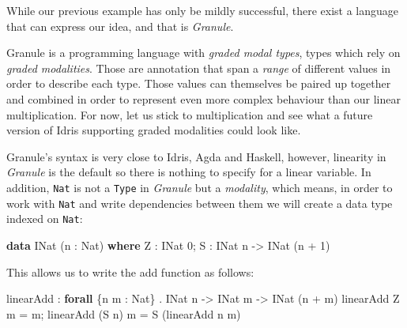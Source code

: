 \documentclass[
]{article}
\newenvironment{Shaded}{}{}
\newcommand{\DataTypeTok}[1]{\textcolor[rgb]{0.56,0.13,0.00}{#1}}
\newcommand{\DecValTok}[1]{\textcolor[rgb]{0.25,0.63,0.44}{#1}}
\newcommand{\KeywordTok}[1]{\textcolor[rgb]{0.00,0.44,0.13}{\textbf{#1}}}
\newcommand{\NormalTok}[1]{#1}
\newcommand{\OperatorTok}[1]{\textcolor[rgb]{0.40,0.40,0.40}{#1}}
\newcommand{\OtherTok}[1]{\textcolor[rgb]{0.00,0.44,0.13}{#1}}
\begin{document}
While our previous example has only be mildly successful, there exist a
language that can express our idea, and that is \emph{Granule}.

Granule is a programming language with \emph{graded modal types}, types
which rely on \emph{graded modalities}. Those are annotation that span a
\emph{range} of different values in order to describe each type. Those
values can themselves be paired up together and combined in order to
represent even more complex behaviour than our linear multiplication.
For now, let us stick to multiplication and see what a future version of
Idris supporting graded modalities could look like.

Granule's syntax is very close to Idris, Agda and Haskell, however,
linearity in \emph{Granule} is the default so there is nothing to
specify for a linear variable. In addition, \texttt{Nat} is not a
\texttt{Type} in \emph{Granule} but a \emph{modality}, which means, in
order to work with \texttt{Nat} and write dependencies between them we
will create a data type indexed on \texttt{Nat}:

\begin{Shaded}
\begin{Highlighting}[]
\KeywordTok{data} \DataTypeTok{INat}\NormalTok{ (n }\OperatorTok{:} \DataTypeTok{Nat}\NormalTok{) }\KeywordTok{where}
  \DataTypeTok{Z} \OperatorTok{:} \DataTypeTok{INat} \DecValTok{0}\NormalTok{;}
  \DataTypeTok{S} \OperatorTok{:} \DataTypeTok{INat}\NormalTok{ n }\OtherTok{{-}\textgreater{}} \DataTypeTok{INat}\NormalTok{ (n }\OperatorTok{+} \DecValTok{1}\NormalTok{)}
\end{Highlighting}
\end{Shaded}

This allows us to write the add function as follows:

\begin{Shaded}
\begin{Highlighting}[]
\NormalTok{linearAdd }\OperatorTok{:} \KeywordTok{forall}\NormalTok{ \{n m }\OperatorTok{:} \DataTypeTok{Nat}\NormalTok{\} }\OperatorTok{.} \DataTypeTok{INat}\NormalTok{ n }\OtherTok{{-}\textgreater{}} \DataTypeTok{INat}\NormalTok{ m }\OtherTok{{-}\textgreater{}} \DataTypeTok{INat}\NormalTok{ (n }\OperatorTok{+}\NormalTok{ m)}
\NormalTok{linearAdd }\DataTypeTok{Z}\NormalTok{ m }\OtherTok{=}\NormalTok{ m;}
\NormalTok{linearAdd (}\DataTypeTok{S}\NormalTok{ n) m }\OtherTok{=} \DataTypeTok{S}\NormalTok{ (linearAdd n m)}
\end{Highlighting}
\end{Shaded}
\end{document}

